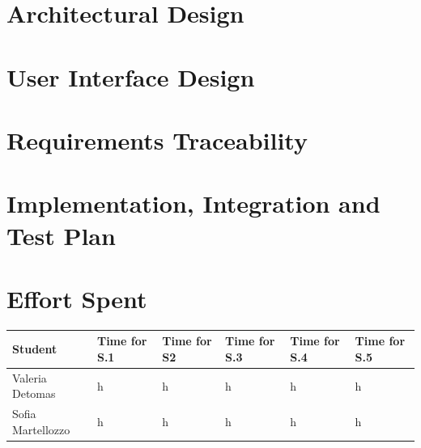\documentclass{article}
\begin{document}
\section{Architectural Design}


\newpage
\section{User Interface Design}


\newpage
\section{Requirements Traceability}


\newpage
\section{Implementation, Integration and Test Plan}



\newpage 
\section{Effort Spent}
\begin{table}[h]
      \centering
      \begin{tabular}{|p{3cm}||p{2cm}|p{2cm}|p{2cm}|p{2cm}|p{1cm}|}
            \hline
            Student & Time for S.1 & Time for S2 & Time for S.3 & Time for S.4 & Time for S.5\\
            \hline
            Valeria Detomas & h & h & h & h & h\\
            \hline
            Sofia Martellozzo & h & h & h & h & h\\
            \hline
      \end{tabular}
\end{table}

\end{document}
